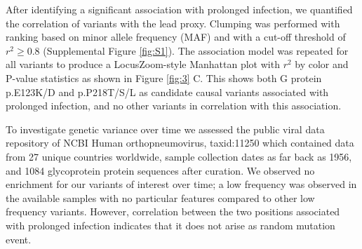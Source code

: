 \documentclass{article} %
\begin{document}
After identifying a significant association with prolonged infection,
we quantified the correlation of variants with the lead proxy.
Clumping was performed with ranking based on minor allele frequency (MAF) and with a cut-off threshold of $r^2 \ge 0.8$ (Supplemental Figure \ref{fig:S1}).
The association model was repeated for all variants to produce a LocusZoom-style Manhattan plot with $r^2$ by color and P-value statistics as shown in 
Figure \ref{fig:3} C.
This shows both G protein 
p.E123K/D and 
p.P218T/S/L as candidate causal variants associated with prolonged infection, and no other variants in correlation with this association. 


To investigate genetic variance over time
we assessed the public viral data repository of NCBI Human orthopneumovirus, taxid:11250 which contained data from 
27 unique countries worldwide, sample collection dates as far back as 1956, and 1084 glycoprotein protein sequences after curation.
We observed no enrichment for our variants of interest over time; 
a low frequency was observed in the available samples with no particular features compared to other low frequency variants. 
However, correlation between the two positions associated with prolonged infection indicates that it does not arise as random mutation event.
\end{document}

